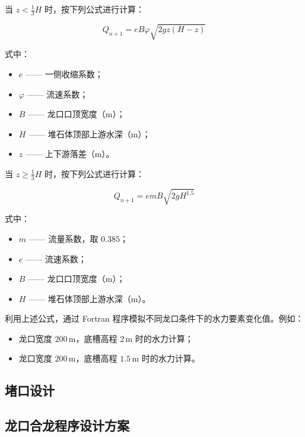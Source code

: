 \documentclass[UTF8, a4paper, 12pt]{ctexart} %
\begin{document}
当 $z < \frac{1}{3}H$ 时，按下列公式进行计算：

\begin{equation}
    Q_{n+1} = e B \varphi \sqrt{2g z (H - z)} 
\end{equation}


式中：
\begin{itemize}
    \item $e$ —— 一侧收缩系数；
    \item $\varphi$ —— 流速系数；
    \item $B$ —— 龙口口顶宽度（$\text{m}$）；
    \item $H$ —— 堆石体顶部上游水深（$\text{m}$）；
    \item $z$ —— 上下游落差（$\text{m}$）。
\end{itemize}


当 $z \geq \frac{1}{3}H$ 时，按下列公式进行计算：

\begin{equation}
Q_{n+1} = e m B \sqrt{2g H^{1.5}}  
\end{equation}


式中：
\begin{itemize}
    \item $m$ —— 流量系数，取 $0.385$；
    \item $e$ —— 流速系数；
    \item $B$ —— 龙口口顶宽度（$\text{m}$）；
    \item $H$ —— 堆石体顶部上游水深（$\text{m}$）。
\end{itemize}

利用上述公式，通过 Fortran 程序模拟不同龙口条件下的水力要素变化值。例如：
\begin{itemize}
    \item 龙口宽度 $200\,\text{m}$，底槽高程 $2\,\text{m}$ 时的水力计算；
    \item 龙口宽度 $200\,\text{m}$，底槽高程 $1.5\,\text{m}$ 时的水力计算。
\end{itemize}
\subsection{堵口设计}
\subsection{龙口合龙程序设计方案}
\end{document}
